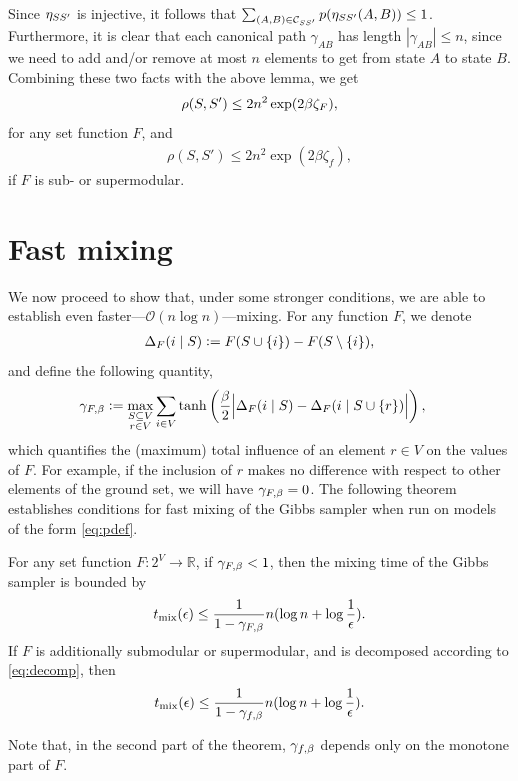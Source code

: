 Since $\eta_{SS'}$ is injective, it follows that $\sum_{(A, B) \in \mathcal{C}_{SS'}} p(\eta_{SS'}(A, B)) \leq 1$.
Furthermore, it is clear that each canonical path $\gamma_{AB}$ has length $|\gamma_{AB}| \leq n$, since we need to add and/or remove at most $n$ elements to get from state $A$ to state $B$.
Combining these two facts with the above lemma, we get
\begin{align*}
  \rho(S, S') \leq 2n^2 \exp(2 \beta \zeta_F),
\end{align*}
for any set function $F$, and
\begin{align*}
  \rho(S, S') \leq 2n^2 \exp(2 \beta \zeta_f),
\end{align*}
if $F$ is sub- or supermodular.


\section{Fast mixing}
We now proceed to show that, under some stronger conditions, we are able to establish even faster---$\mathcal{O}(n \log n)$---mixing.
For any function $F$, we denote
\begin{align*}
\Delta_F(i\mid S) \vcentcolon= F(S \cup \{i\}) - F(S \setminus \{i\}),
\end{align*}
and define the following quantity,
\begin{align*}
  \gamma_{F,\beta} &\vcentcolon= \max_{\substack{S \subseteq V\\r \in V}} \sum_{\substack{i \in V}} \tanh\left(\frac{\beta}{2} \Big|\Delta_F(i\mid S) - \Delta_F(i\mid S \cup \{r\})\Big| \right),
\end{align*}
which quantifies the (maximum) total influence of an element $r \in V$ on the values of $F$.
For example, if the inclusion of $r$ makes no difference with respect to other elements of the ground set, we will have $\gamma_{F,\beta} = 0$.
The following theorem establishes conditions for fast mixing of the Gibbs sampler when run on models of the form \eqref{eq:pdef}.

\begin{theorem} \label{thm:fast}
  For any set function $F : 2^V \to \mathbb{R}$, if $\gamma_{F,\beta} < 1$, then the mixing time of the Gibbs sampler is bounded by
  \begin{align*}
  	t_{\mathrm{mix}}(\epsilon) \leq \frac{1}{1 - \gamma_{F,\beta}}n(\log n + \log \frac{1}{\epsilon}).
  \end{align*}
  If $F$ is additionally submodular or supermodular, and is decomposed according to \eqref{eq:decomp}, then
  \begin{align*}
  	t_{\mathrm{mix}}(\epsilon) \leq \frac{1}{1 - \gamma_{f,\beta}}n(\log n + \log \frac{1}{\epsilon}).
  \end{align*}
\end{theorem}
Note that, in the second part of the theorem, $\gamma_{f,\beta}$ depends only on the monotone part of $F$. 

